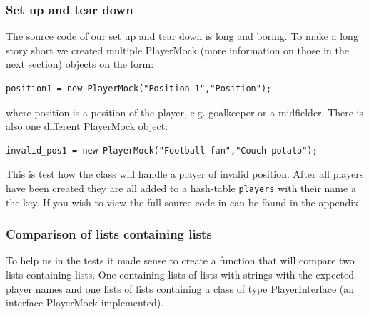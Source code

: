 \documentclass{article}
\begin{document}
\subsubsection{Set up and tear down}
The source code of our set up and tear down is long and boring. To make a long story short we created multiple PlayerMock (more information on those in the next section) objects on the form:
\begin{verbatim}
position1 = new PlayerMock("Position 1","Position");
\end{verbatim}
where position is a position of the player, e.g. goalkeeper or a midfielder. There is also one different PlayerMock object:
\begin{verbatim}
invalid_pos1 = new PlayerMock("Football fan","Couch potato");
\end{verbatim}
This is test how the class will handle a player of invalid position. After all players have been created they are all added to a hash-table \texttt{players} with their name a the key. If you wish to view the full source code in can be found in the appendix.

\subsubsection{Comparison of lists containing lists}
To help us in the tests it made sense to create a function that will compare two lists containing lists. One containing lists of lists with strings with the expected player names and one lists of lists containing a class of type PlayerInterface (an interface PlayerMock implemented).
\end{document}
